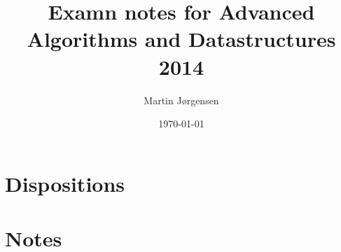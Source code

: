 \documentclass[a4paper,12pt]{article}
\title{Examn notes for Advanced Algorithms and Datastructures 2014}
\author{Martin Jørgensen}
\date{\today}
\begin{document}
\maketitle

\tableofcontents
\pagebreak

\section{Dispositions}




\pagebreak
\section{Notes}

\end{document}
